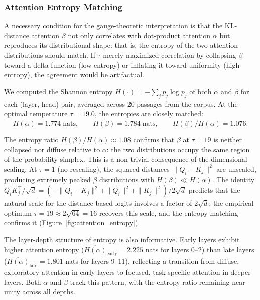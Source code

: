 \documentclass[twoside,11pt]{article}
\begin{document}
\subsubsection{Attention Entropy Matching}
\label{sec:entropy_analysis}

A necessary condition for the gauge-theoretic interpretation is that the KL-distance attention $\beta$ not only correlates with dot-product attention $\alpha$ but reproduces its distributional shape: that is, the entropy of the two attention distributions should match. If $\tau$ merely maximized correlation by collapsing $\beta$ toward a delta function (low entropy) or inflating it toward uniformity (high entropy), the agreement would be artifactual.

We computed the Shannon entropy $H(\cdot) = -\sum_j p_j \log p_j$ of both $\alpha$ and $\beta$ for each (layer, head) pair, averaged across 20 passages from the corpus. At the optimal temperature $\tau = 19.0$, the entropies are closely matched:
\begin{equation}
\overline{H(\alpha)} = 1.774 \;\text{nats}, \qquad \overline{H(\beta)} = 1.784 \;\text{nats}, \qquad \overline{H(\beta)/H(\alpha)} = 1.076.
\end{equation}

The entropy ratio $H(\beta)/H(\alpha) \approx 1.08$ confirms that $\beta$ at $\tau = 19$ is neither collapsed nor diffuse relative to $\alpha$: the two distributions occupy the same region of the probability simplex. This is a non-trivial consequence of the dimensional scaling. At $\tau = 1$ (no rescaling), the squared distances $\|Q_i - K_j\|^2$ are unscaled, producing extremely peaked $\beta$ distributions with $H(\beta) \ll H(\alpha)$. The identity $Q_i K_j^\top / \sqrt{d} = (-\|Q_i - K_j\|^2 + \|Q_i\|^2 + \|K_j\|^2)/2\sqrt{d}$ predicts that the natural scale for the distance-based logits involves a factor of $2\sqrt{d}$; the empirical optimum $\tau = 19 \approx 2\sqrt{64} = 16$ recovers this scale, and the entropy matching confirms it (Figure~\ref{fig:attention_entropy}).

The layer-depth structure of entropy is also informative. Early layers exhibit higher attention entropy ($\overline{H(\alpha)}_{\text{early}} = 2.225$ nats for layers 0--2) than late layers ($\overline{H(\alpha)}_{\text{late}} = 1.801$ nats for layers 9--11), reflecting a transition from diffuse, exploratory attention in early layers to focused, task-specific attention in deeper layers. Both $\alpha$ and $\beta$ track this pattern, with the entropy ratio remaining near unity across all depths.
\end{document}
